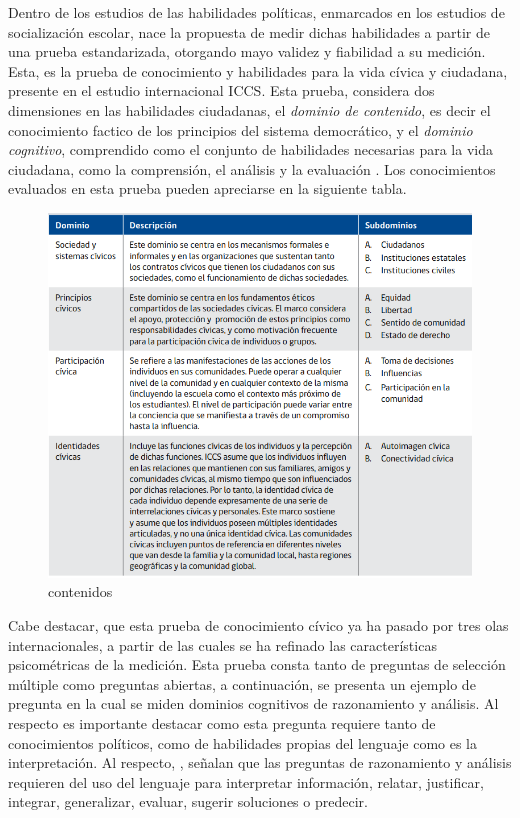 \documentclass[12pt,twoside]{templates/facsothesis}
\begin{document}
Dentro de los estudios de las habilidades políticas, enmarcados en los estudios de socialización escolar, nace la propuesta de medir dichas habilidades a partir de una prueba estandarizada, otorgando mayo validez y fiabilidad a su medición. Esta, es la prueba de conocimiento y habilidades para la vida cívica y ciudadana, presente en el estudio internacional ICCS. Esta prueba, considera dos dimensiones en las habilidades ciudadanas, el \emph{dominio de contenido}, es decir el conocimiento factico de los principios del sistema democrático, y el \emph{dominio cognitivo}, comprendido como el conjunto de habilidades necesarias para la vida ciudadana, como la comprensión, el análisis y la evaluación \citep{schulzEstudioInternacionalSobre2011}. Los conocimientos evaluados en esta prueba pueden apreciarse en la siguiente tabla.

\begin{figure}

{\centering \includegraphics[width=0.8\linewidth]{images/Contenidos} 

}

\caption{contenidos}\label{fig:unnamed-chunk-1}
\end{figure}

Cabe destacar, que esta prueba de conocimiento cívico ya ha pasado por tres olas internacionales, a partir de las cuales se ha refinado las características psicométricas de la medición. Esta prueba consta tanto de preguntas de selección múltiple como preguntas abiertas, a continuación, se presenta un ejemplo de pregunta en la cual se miden dominios cognitivos de razonamiento y análisis. Al respecto es importante destacar como esta pregunta requiere tanto de conocimientos políticos, como de habilidades propias del lenguaje como es la interpretación. Al respecto, \citet{schulzEstudioInternacionalSobre2011}, señalan que las preguntas de razonamiento y análisis requieren del uso del lenguaje para interpretar información, relatar, justificar, integrar, generalizar, evaluar, sugerir soluciones o predecir.
\end{document}
